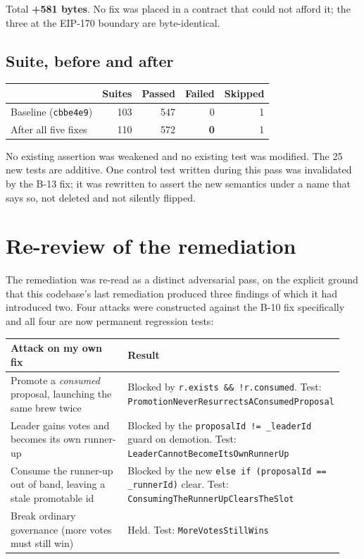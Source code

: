 \documentclass[11pt,a4paper]{article}
\newcommand{\code}[1]{\texttt{\small #1}}
\begin{document}
\noindent Total \textbf{+581 bytes}. No fix was placed in a contract that could not afford
it; the three at the EIP-170 boundary are byte-identical.

\subsection{Suite, before and after}

\begin{center}
\begin{tabular}{@{}lrrrr@{}}
\toprule
& \textbf{Suites} & \textbf{Passed} & \textbf{Failed} & \textbf{Skipped} \\
\midrule
Baseline (\code{cbbe4e9}) & 103 & 547 & 0 & 1 \\
After all five fixes & 110 & 572 & \textbf{0} & 1 \\
\bottomrule
\end{tabular}
\end{center}

\noindent No existing assertion was weakened and no existing test was modified. The 25 new
tests are additive. One control test written during this pass was invalidated by the B-13
fix; it was rewritten to assert the new semantics under a name that says so, not deleted
and not silently flipped.

\section{Re-review of the remediation}

The remediation was re-read as a distinct adversarial pass, on the explicit ground that
this codebase's last remediation produced three findings of which it had introduced two.
Four attacks were constructed against the B-10 fix specifically and all four are now
permanent regression tests:

\begin{longtable}{@{}p{0.40\linewidth}p{0.54\linewidth}@{}}
\toprule
\textbf{Attack on my own fix} & \textbf{Result} \\
\midrule
\endhead
Promote a \emph{consumed} proposal, launching the same brew twice &
  Blocked by \code{r.exists \&\& !r.consumed}. Test:
  \code{PromotionNeverResurrectsAConsumedProposal} \\
Leader gains votes and becomes its own runner-up &
  Blocked by the \code{proposalId != \_leaderId} guard on demotion. Test:
  \code{LeaderCannotBecomeItsOwnRunnerUp} \\
Consume the runner-up out of band, leaving a stale promotable id &
  Blocked by the new \code{else if (proposalId == \_runnerId)} clear. Test:
  \code{ConsumingTheRunnerUpClearsTheSlot} \\
Break ordinary governance (more votes must still win) &
  Held. Test: \code{MoreVotesStillWins} \\
\bottomrule
\end{longtable}
\end{document}
